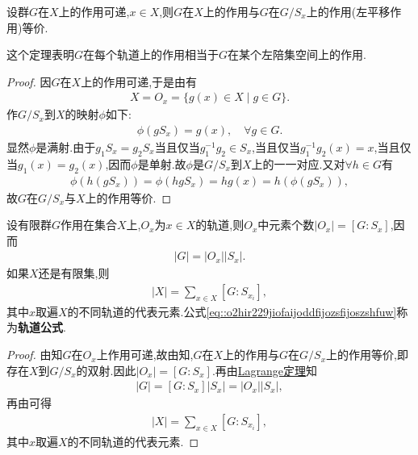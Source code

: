 \documentclass[../../main.tex]{subfiles}%
\begin{document}
\begin{theorem}\label{theorem:抽象代数--定理4.2.3}
设群$G$在$X$上的作用可递,$x \in X$,则$G$在$X$上的作用与$G$在$G/S_x$上的作用(左平移作用)等价.
\end{theorem}
\begin{remark}
这个定理表明$G$在每个轨道上的作用相当于$G$在某个左陪集空间上的作用.
\end{remark}
\begin{proof}
因$G$在$X$上的作用可递,于是由有
\begin{align*}
X = O_x = \{g(x)\in X \mid g \in G\}.
\end{align*}
作$G/S_x$到$X$的映射$\phi$如下:
\begin{align*}
\phi(gS_x) = g(x), \quad \forall g \in G.
\end{align*}
显然$\phi$是满射.由于$g_1S_x = g_2S_x$当且仅当$g_1^{-1}g_2 \in S_x$,当且仅当$g_1^{-1}g_2(x) = x$,当且仅当$g_1(x) = g_2(x)$,因而$\phi$是单射.故$\phi$是$G/S_x$到$X$上的一一对应.又对$\forall h \in G$有
\begin{align*}
\phi(h(gS_x)) = \phi(hgS_x) = hg(x) = h(\phi(gS_x)),
\end{align*}
故$G$在$G/S_x$与$X$上的作用等价.
\end{proof}

\begin{corollary}[轨道公式]\label{corollary:有限群轨道的阶与其商掉迷向子群的阶相同}
设有限群$G$作用在集合$X$上,$O_x$为$x \in X$的轨道,则$O_x$中元素个数$|O_x| = [G: S_x]$,因而
\begin{align*}
|G|=\left|O_x \right|\left| S_x \right|.
\end{align*}
如果$X$还是有限集,则
\begin{align}\label{eq::o2hir229jiofaijoddfijozsfijoszshfuw}
|X|=\sum_{x\in X}[G:S_{x_i}],
\end{align}
其中$x$取遍$X$的不同轨道的代表元素.公式\eqref{eq::o2hir229jiofaijoddfijozsfijoszshfuw}称为\textbf{轨道公式}.
\end{corollary}
\begin{proof}
由知$G$在$O_x$上作用可递,故由知,$G$在$X$上的作用与$G$在$G/S_x$上的作用等价,即存在$X$到$G/S_x$的双射.因此$|O_x| = [G: S_x]$.再由\hyperref[theorem:抽象代数--Lagrange定理]{Lagrange定理}知
\begin{align*}
\left| G \right|=\left[ G:S_x \right] \left| S_x \right|=\left| O_x \right|\left| S_x \right|,
\end{align*}
再由可得
\begin{align*}
|X|=\sum_{x\in X}[G:S_{x_i}],
\end{align*}
其中$x$取遍$X$的不同轨道的代表元素.
\end{proof}
\end{document}
